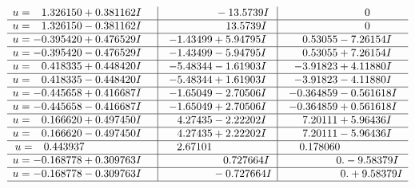 \documentclass[1p]{elsarticle_modified}
\theoremstyle{definition}
\begin{document}
$$\begin{array}{c|c|c}
\begin{aligned}
u &= \phantom{-}1.326150 + 0.381162 I\end{aligned}
 & \phantom{-0.000000 } -13.5739 I & \phantom{-0.000000 } 0 \\ \hline\begin{aligned}
u &= \phantom{-}1.326150 - 0.381162 I\end{aligned}
 & \phantom{-0.000000 -}13.5739 I & \phantom{-0.000000 } 0 \\ \hline\begin{aligned}
u &= -0.395420 + 0.476529 I\end{aligned}
 & -1.43499 + 5.94795 I & \phantom{-}0.53055 - 7.26154 I \\ \hline\begin{aligned}
u &= -0.395420 - 0.476529 I\end{aligned}
 & -1.43499 - 5.94795 I & \phantom{-}0.53055 + 7.26154 I \\ \hline\begin{aligned}
u &= \phantom{-}0.418335 + 0.448420 I\end{aligned}
 & -5.48344 - 1.61903 I & -3.91823 + 4.11880 I \\ \hline\begin{aligned}
u &= \phantom{-}0.418335 - 0.448420 I\end{aligned}
 & -5.48344 + 1.61903 I & -3.91823 - 4.11880 I \\ \hline\begin{aligned}
u &= -0.445658 + 0.416687 I\end{aligned}
 & -1.65049 - 2.70506 I & -0.364859 - 0.561618 I \\ \hline\begin{aligned}
u &= -0.445658 - 0.416687 I\end{aligned}
 & -1.65049 + 2.70506 I & -0.364859 + 0.561618 I \\ \hline\begin{aligned}
u &= \phantom{-}0.166620 + 0.497450 I\end{aligned}
 & \phantom{-}4.27435 - 2.22202 I & \phantom{-}7.20111 + 5.96436 I \\ \hline\begin{aligned}
u &= \phantom{-}0.166620 - 0.497450 I\end{aligned}
 & \phantom{-}4.27435 + 2.22202 I & \phantom{-}7.20111 - 5.96436 I \\ \hline\begin{aligned}
u &= \phantom{-}0.443937\phantom{ +0.000000I}\end{aligned}
 & \phantom{-}2.67101\phantom{ +0.000000I} & \phantom{-}0.178060\phantom{ +0.000000I} \\ \hline\begin{aligned}
u &= -0.168778 + 0.309763 I\end{aligned}
 & \phantom{-0.000000 -}0.727664 I & \phantom{-0.000000 } 0. - 9.58379 I \\ \hline\begin{aligned}
u &= -0.168778 - 0.309763 I\end{aligned}
 & \phantom{-0.000000 } -0.727664 I & \phantom{-0.000000 -}0. + 9.58379 I\\
 \hline 
 \end{array}$$\newpage
\end{document}
